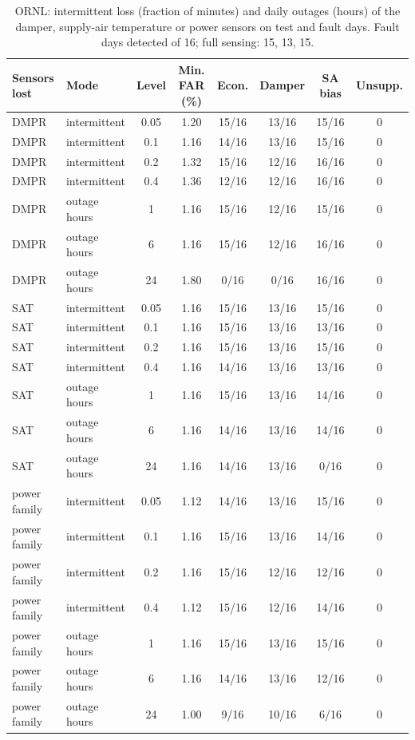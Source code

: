 \begin{table}[h!]\centering\scriptsize\caption{ORNL: intermittent loss (fraction of minutes) and daily outages (hours) of the damper, supply-air temperature or power sensors on test and fault days. Fault days detected of 16; full sensing: 15, 13, 15.}\label{tab:S6}
\begin{tabular}{llccccc c}\toprule
Sensors lost & Mode & Level & Min. FAR (\%) & Econ. & Damper & SA bias & Unsupp.\\\midrule
DMPR & intermittent & 0.05 & 1.20 & 15/16 & 13/16 & 15/16 & 0\\
DMPR & intermittent & 0.1 & 1.16 & 14/16 & 13/16 & 15/16 & 0\\
DMPR & intermittent & 0.2 & 1.32 & 15/16 & 12/16 & 16/16 & 0\\
DMPR & intermittent & 0.4 & 1.36 & 12/16 & 12/16 & 16/16 & 0\\
DMPR & outage hours & 1 & 1.16 & 15/16 & 12/16 & 15/16 & 0\\
DMPR & outage hours & 6 & 1.16 & 15/16 & 12/16 & 16/16 & 0\\
DMPR & outage hours & 24 & 1.80 & 0/16 & 0/16 & 16/16 & 0\\
SAT & intermittent & 0.05 & 1.16 & 15/16 & 13/16 & 15/16 & 0\\
SAT & intermittent & 0.1 & 1.16 & 15/16 & 13/16 & 13/16 & 0\\
SAT & intermittent & 0.2 & 1.16 & 15/16 & 13/16 & 15/16 & 0\\
SAT & intermittent & 0.4 & 1.16 & 14/16 & 13/16 & 13/16 & 0\\
SAT & outage hours & 1 & 1.16 & 15/16 & 13/16 & 14/16 & 0\\
SAT & outage hours & 6 & 1.16 & 14/16 & 13/16 & 14/16 & 0\\
SAT & outage hours & 24 & 1.16 & 14/16 & 13/16 & 0/16 & 0\\
power family & intermittent & 0.05 & 1.12 & 14/16 & 13/16 & 15/16 & 0\\
power family & intermittent & 0.1 & 1.16 & 15/16 & 13/16 & 14/16 & 0\\
power family & intermittent & 0.2 & 1.16 & 15/16 & 12/16 & 12/16 & 0\\
power family & intermittent & 0.4 & 1.12 & 15/16 & 12/16 & 14/16 & 0\\
power family & outage hours & 1 & 1.16 & 15/16 & 13/16 & 15/16 & 0\\
power family & outage hours & 6 & 1.16 & 14/16 & 13/16 & 12/16 & 0\\
power family & outage hours & 24 & 1.00 & 9/16 & 10/16 & 6/16 & 0\\
\bottomrule\end{tabular}\end{table}

